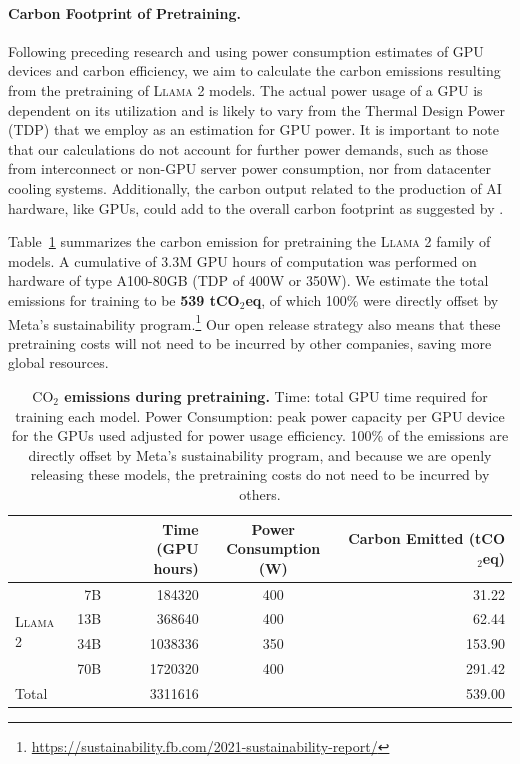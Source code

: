 \documentclass{article}
\newcommand{\cinnamon}{\textsc{Llama 2}\xspace}
\begin{document}
\paragraph{Carbon Footprint of Pretraining.} 
\label{sec:carbon}
Following preceding research \citep{bender-et-al-2021,patterson2021carbon,wu2022sustainable,dodge2022measuring} and using power consumption estimates of GPU devices and carbon efficiency, we aim to calculate the carbon emissions resulting from the pretraining of \cinnamon models. The actual power usage of a GPU is dependent on its utilization and is likely to vary from the Thermal Design Power (TDP) that we employ as an estimation for GPU power. It is important to note that our calculations do not account for further power demands, such as those from interconnect or non-GPU server power consumption, nor from datacenter cooling systems. Additionally, the carbon output related to the production of AI hardware, like GPUs, could add to the overall carbon footprint as suggested by \cite{gupta2022chasing,gupta2022act}.

Table~\ref{tab:co2} summarizes the carbon emission for pretraining the \cinnamon family of models. A cumulative of 3.3M GPU hours of computation was performed on hardware of type A100-80GB (TDP of 400W or 350W). We estimate the total emissions for training to be \textbf{539 tCO$_2$eq}, of which 100\% were directly offset by Meta's sustainability program.\footnote{\url{https://sustainability.fb.com/2021-sustainability-report/}} Our open release strategy also means that these pretraining
costs will not need to be incurred by other companies, saving more global resources.

  \begin{table}[t!]
    \small
    \centering
    \setlength{\tabcolsep}{4pt} 
    \begin{tabular}{lrrcr}
    \toprule
     & &  \shortstack{Time \\ (GPU hours)} & \shortstack{Power \\ Consumption (W)}  & \shortstack{Carbon Emitted \\ (tCO$_2$eq)}   \\
    \midrule
    \multirow{4}{*}{\cinnamon} & 7B & 184320 & 400  & 31.22 \\
     &  13B & 368640 & 400  & 62.44 \\
    &  34B & 1038336 & 350  & 153.90 \\
     & 70B & 1720320 & 400  & 291.42 \\
    \midrule
     Total &  & 3311616 &  &  539.00 \\
    \bottomrule
    \end{tabular}
    \caption{
    \textbf{$\text{CO}_2$ emissions during pretraining.} Time: total GPU time required for training each model. Power Consumption: peak power capacity per GPU device for the GPUs used adjusted for power usage efficiency. 100\% of the emissions are directly offset by Meta's sustainability program, and because
    we are openly releasing these models, the pretraining costs do not need to be 
    incurred by others.
    \label{tab:co2}
    }
  \end{table}
  
\end{document}
